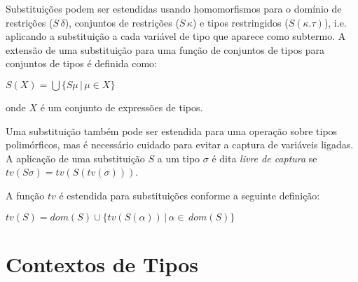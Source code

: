 Substitui\c{c}\~oes podem ser estendidas usando homomorfismos para o dom\'inio de restri\c{c}\~oes ($S\,\delta$), 
conjuntos de restri\c{c}\~oes ($S\,\kappa$) e tipos restringidos ($S(\kappa.\tau)$), i.e. aplicando a substitui\c{c}\~ao
a cada vari\'avel de tipo que aparece como subtermo. A extens\~ao de uma substitui\c{c}\~ao para uma fun\c{c}\~ao de 
conjuntos de tipos para conjuntos de tipos \'e definida como:
\begin{center}
    $S(X)=\bigcup\{S\mu\,|\,\mu\in X\}$
\end{center}
onde $X$ \'e um conjunto de express\~oes de tipos.

Uma substitui\c{c}\~ao tamb\'em pode ser estendida para uma opera\c{c}\~ao sobre tipos polim\'orficos, mas \'e 
necess\'ario cuidado para evitar a captura de vari\'aveis ligadas. A aplica\c{c}\~ao de uma substitui\c{c}\~ao $S$
a um tipo $\sigma$ \'e dita \emph{livre de captura} se $tv(S\sigma)=tv(S(tv(\sigma)))$.

A fun\c{c}\~ao $tv$ \'e estendida para substitui\c{c}\~oes conforme a seguinte defini\c{c}\~ao:
\begin{center}
    $tv(S) = dom(S)\cup\{tv(S(\alpha))\,|\,\alpha\in\,dom(S)\}$
\end{center}

\section{Contextos de Tipos}\label{contextos}

